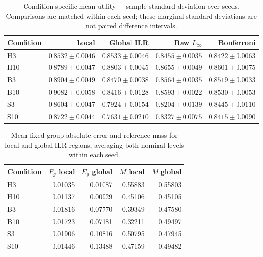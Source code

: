 \documentclass{article}
\begin{document}
\begin{table}[h]
\centering
\caption{Condition-specific mean utility $\pm$ sample standard deviation over seeds. Comparisons are matched within each seed; these marginal standard deviations are not paired difference intervals.}
\label{tab:case}
\begin{tabular}{lrrrr}
\toprule
Condition & Local & Global ILR & Raw $L_\infty$ & Bonferroni\\
\midrule
H3 & $0.8532\pm0.0046$ & $0.8533\pm0.0046$ & $0.8455\pm0.0035$ & $0.8422\pm0.0063$\\
H10 & $0.8789\pm0.0047$ & $0.8803\pm0.0045$ & $0.8655\pm0.0049$ & $0.8601\pm0.0075$\\
B3 & $0.8904\pm0.0049$ & $0.8470\pm0.0038$ & $0.8564\pm0.0035$ & $0.8519\pm0.0033$\\
B10 & $0.9082\pm0.0058$ & $0.8416\pm0.0128$ & $0.8593\pm0.0022$ & $0.8530\pm0.0053$\\
S3 & $0.8604\pm0.0047$ & $0.7924\pm0.0154$ & $0.8204\pm0.0139$ & $0.8445\pm0.0110$\\
S10 & $0.8722\pm0.0044$ & $0.7631\pm0.0210$ & $0.8327\pm0.0075$ & $0.8415\pm0.0090$\\
\bottomrule
\end{tabular}
\end{table}

\begin{table}[h]
\centering
\caption{Mean fixed-group absolute error and reference mass for local and global ILR regions, averaging both nominal levels within each seed.}
\label{tab:group}
\begin{tabular}{lrrrr}
\toprule
Condition & $E_g$ local & $E_g$ global & $M$ local & $M$ global\\
\midrule
H3 & 0.01035 & 0.01087 & 0.55883 & 0.55803\\
H10 & 0.01137 & 0.00929 & 0.45106 & 0.45105\\
B3 & 0.01816 & 0.07770 & 0.39349 & 0.47580\\
B10 & 0.01723 & 0.07181 & 0.32211 & 0.49497\\
S3 & 0.01906 & 0.10816 & 0.50795 & 0.47945\\
S10 & 0.01446 & 0.13488 & 0.47159 & 0.49482\\
\bottomrule
\end{tabular}
\end{table}
\end{document}
